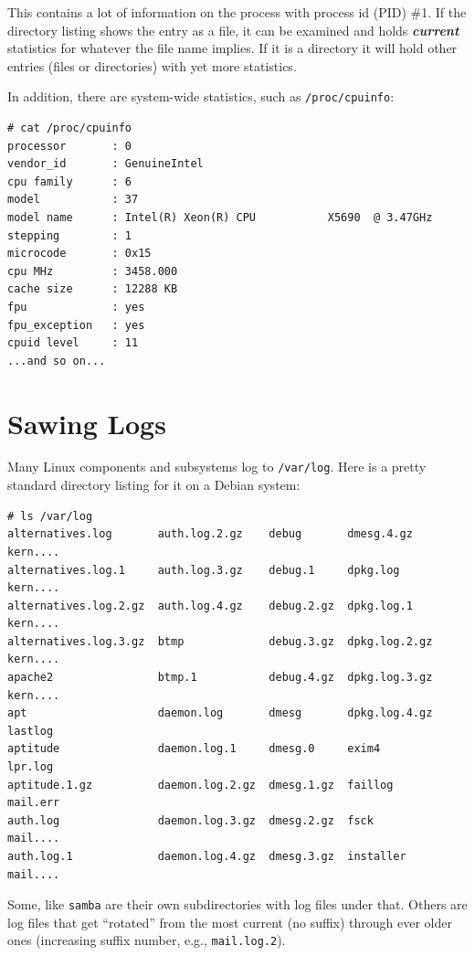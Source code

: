 \documentclass[10pt,]{book}
\numberwithin{figure}{chapter}
\begin{document}
This contains a lot of information on the process with process id (PID)
\#1. If the directory listing shows the entry as a file, it can be
examined and holds \textbf{\emph{current}} statistics for whatever the
file name implies. If it is a directory it will hold other entries
(files or directories) with yet more statistics.

In addition, there are system-wide statistics, such as
\texttt{/proc/cpuinfo}:

\begin{verbatim}
# cat /proc/cpuinfo
processor       : 0
vendor_id       : GenuineIntel
cpu family      : 6
model           : 37
model name      : Intel(R) Xeon(R) CPU           X5690  @ 3.47GHz
stepping        : 1
microcode       : 0x15
cpu MHz         : 3458.000
cache size      : 12288 KB
fpu             : yes
fpu_exception   : yes
cpuid level     : 11
...and so on...
\end{verbatim}

\section{Sawing Logs}\label{sawing-logs}

Many Linux components and subsystems log to \texttt{/var/log}. Here is a
pretty standard directory listing for it on a Debian system:

\begin{verbatim}
# ls /var/log
alternatives.log       auth.log.2.gz    debug       dmesg.4.gz     kern....
alternatives.log.1     auth.log.3.gz    debug.1     dpkg.log       kern....
alternatives.log.2.gz  auth.log.4.gz    debug.2.gz  dpkg.log.1     kern....
alternatives.log.3.gz  btmp             debug.3.gz  dpkg.log.2.gz  kern....
apache2                btmp.1           debug.4.gz  dpkg.log.3.gz  kern....
apt                    daemon.log       dmesg       dpkg.log.4.gz  lastlog
aptitude               daemon.log.1     dmesg.0     exim4          lpr.log
aptitude.1.gz          daemon.log.2.gz  dmesg.1.gz  faillog        mail.err
auth.log               daemon.log.3.gz  dmesg.2.gz  fsck           mail....
auth.log.1             daemon.log.4.gz  dmesg.3.gz  installer      mail....
\end{verbatim}

Some, like \texttt{samba} are their own subdirectories with log files
under that. Others are log files that get ``rotated'' from the most
current (no suffix) through ever older ones (increasing suffix number,
e.g., \texttt{mail.log.2}).
\end{document}
